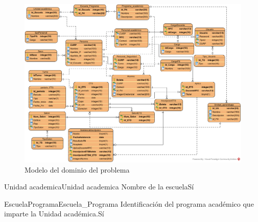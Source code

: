 \begin{figure}[htbp!]
	\begin{center}
		\includegraphics[angle=90,width=.95\textwidth]{images/DER}
		\caption{Modelo del dominio del problema}
		\label{fig:modeloDeDominio}
	\end{center}
\end{figure}
\begin{cdtEntidad}{Unidad academica}{Unidad academica}
	{Nombre de la escuela}{Sí}
\end{cdtEntidad}
\begin{cdtEntidad}{EscuelaPrograma}{Escuela\_Programa}
	{Identificación del programa académico que imparte la Unidad académica.}{Sí}
\end{cdtEntidad}
